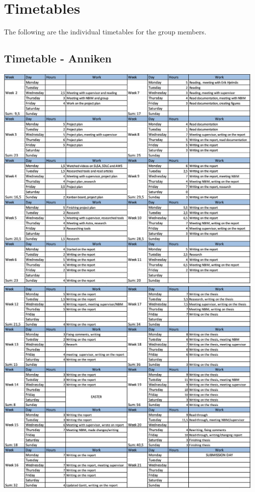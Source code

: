 \chapter{Timetables}
The following are the individual timetables for the group members.


\newpage
\section{Timetable - Anniken}
\vspace{3cm}
\includegraphics[width=\textwidth]{Images/annikentimer.png}
\newpage
\vspace{3cm}
\includegraphics[width=\textwidth]{Images/annikentimer2.png}
\newpage
